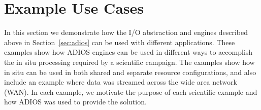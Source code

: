 \section{Example Use Cases}
\label{sec:examples}

In this section we demonstrate how the I/O abstraction and engines described above in Section~\ref{sec:adios} can be used with different applications. These examples show how ADIOS engines can be used in different ways to accomplish the in situ processing required by a scientific campaign. The examples show how in situ can be used in both shared and separate resource configurations, and also include an example where data was streamed across the wide area network (WAN). In each example, we motivate the purpose of each scientific example and how ADIOS was used to provide the solution.

